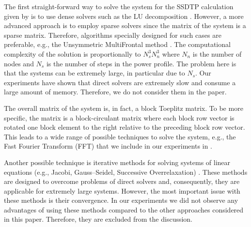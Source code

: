 The first straight-forward way to solve the system for the SSDTP calculation given by  is to use dense solvers such as the LU decomposition \cite{press2007}. However, a more advanced approach is to employ sparse solvers since the matrix of the system is a sparse matrix. Therefore, algorithms specially designed for such cases are preferable, e.g., the Unsymmetric MultiFrontal method \cite{umfpack2004}. The computational complexity of the solution is proportionally to $N_s^3 N_n^3$ \cite{press2007} where $N_n$ is the number of nodes and $N_s$ is the number of steps in the power profile. The problem here is that the systems can be extremely large, in particular due to $N_s$. Our experiments have shown that direct solvers are extremely slow and consume a large amount of memory. Therefore, we do not consider them in the paper.

The overall matrix of the system is, in fact, a block Toeplitz matrix. To be more specific, the matrix is a block-circulant matrix where each block row vector is rotated one block element to the right relative to the preceding block row vector. This leads to a wide range of possible techniques to solve the system, e.g., the Fast Fourier Transform (FFT) \cite{mazancourt1983} that we include in our experiments in .

Another possible technique is iterative methods for solving systems of linear equations (e.g., Jacobi, Gauss--Seidel, Successive Overrelaxation) \cite{press2007}. These methods are designed to overcome problems of direct solvers and, consequently, they are applicable for extremely large systems. However, the most important issue with these methods is their convergence. In our experiments we did not observe any advantages of using these methods compared to the other approaches considered in this paper. Therefore, they are excluded from the discussion.
